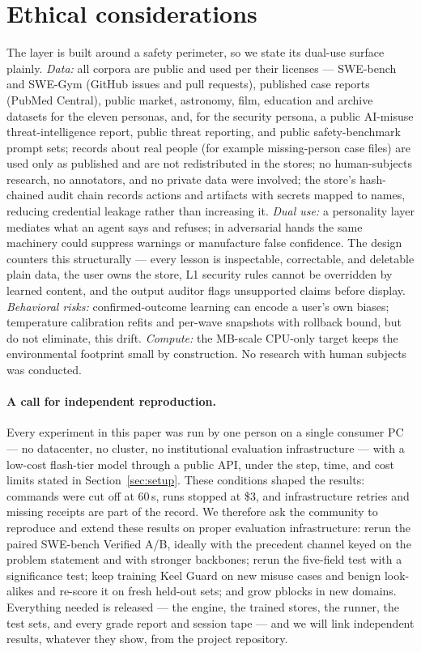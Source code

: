 \documentclass[11pt]{article}
\begin{document}
\section{Ethical considerations}
The layer is built around a safety perimeter, so we state its dual-use surface plainly. \emph{Data:} all corpora are public and used per their licenses --- SWE-bench and SWE-Gym (GitHub issues and pull requests), published case reports (PubMed Central), public market, astronomy, film, education and archive datasets for the eleven personas, and, for the security persona, a public AI-misuse threat-intelligence report, public threat reporting, and public safety-benchmark prompt sets; records about real people (for example missing-person case files) are used only as published and are not redistributed in the stores; no human-subjects research, no annotators, and no private data were involved; the store's hash-chained audit chain records actions and artifacts with secrets mapped to names, reducing credential leakage rather than increasing it. \emph{Dual use:} a personality layer mediates what an agent says and refuses; in adversarial hands the same machinery could suppress warnings or manufacture false confidence. The design counters this structurally --- every lesson is inspectable, correctable, and deletable plain data, the user owns the store, L1 security rules cannot be overridden by learned content, and the output auditor flags unsupported claims before display. \emph{Behavioral risks:} confirmed-outcome learning can encode a user's own biases; temperature calibration refits and per-wave snapshots with rollback bound, but do not eliminate, this drift. \emph{Compute:} the MB-scale CPU-only target keeps the environmental footprint small by construction. No research with human subjects was conducted.

\paragraph{A call for independent reproduction.} Every experiment in this paper was run by one person on a single consumer PC --- no datacenter, no cluster, no institutional evaluation infrastructure --- with a low-cost flash-tier model through a public API, under the step, time, and cost limits stated in Section~\ref{sec:setup}. These conditions shaped the results: commands were cut off at 60\,s, runs stopped at \$3, and infrastructure retries and missing receipts are part of the record. We therefore ask the community to reproduce and extend these results on proper evaluation infrastructure: rerun the paired SWE-bench Verified A/B, ideally with the precedent channel keyed on the problem statement and with stronger backbones; rerun the five-field test with a significance test; keep training Keel Guard on new misuse cases and benign look-alikes and re-score it on fresh held-out sets; and grow pblocks in new domains. Everything needed is released --- the engine, the trained stores, the runner, the test sets, and every grade report and session tape --- and we will link independent results, whatever they show, from the project repository.
\end{document}
